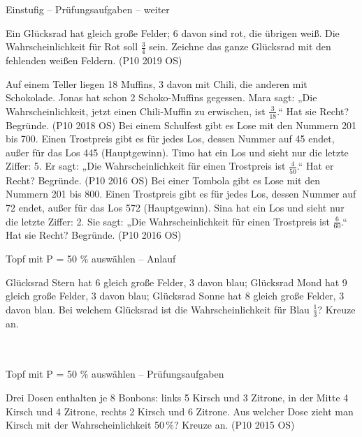 \begin{aufgabe}{Einstufig – Prüfungsaufgaben – weiter}
\begin{teile}
\teil Ein Glücksrad hat gleich große Felder; 6 davon sind rot, die übrigen weiß. Die Wahrscheinlichkeit für Rot soll $\frac{3}{4}$ sein. Zeichne das ganze Glücksrad mit den fehlenden weißen Feldern. \hfill (P10 2019 OS)

\kreisleer[2]
\teil Auf einem Teller liegen 18 Muffins, 3 davon mit Chili, die anderen mit Schokolade. Jonas hat schon 2 Schoko-Muffins gegessen. Mara sagt: „Die Wahrscheinlichkeit, jetzt einen Chili-Muffin zu erwischen, ist $\frac{3}{18}$.“ Hat sie Recht? Begründe. \hfill (P10 2018 OS)
\steil Bei einem Schulfest gibt es Lose mit den Nummern 201 bis 700. Einen Trostpreis gibt es für jedes Los, dessen Nummer auf 45 endet, außer für das Los 445 (Hauptgewinn). Timo hat ein Los und sieht nur die letzte Ziffer: 5. Er sagt: „Die Wahrscheinlichkeit für einen Trostpreis ist $\frac{4}{50}$.“ Hat er Recht? Begründe. \hfill (P10 2016 OS)
\steil Bei einer Tombola gibt es Lose mit den Nummern 201 bis 800. Einen Trostpreis gibt es für jedes Los, dessen Nummer auf 72 endet, außer für das Los 572 (Hauptgewinn). Sina hat ein Los und sieht nur die letzte Ziffer: 2. Sie sagt: „Die Wahrscheinlichkeit für einen Trostpreis ist $\frac{6}{60}$.“ Hat sie Recht? Begründe. \hfill (P10 2016 OS)
\end{teile}
\end{aufgabe}

\begin{aufgabe}{Topf mit P = 50 \% auswählen – Anlauf}
\begin{teile}
\teil Glücksrad Stern hat 6 gleich große Felder, 3 davon blau; Glücksrad Mond hat 9 gleich große Felder, 3 davon blau; Glücksrad Sonne hat 8 gleich große Felder, 3 davon blau. Bei welchem Glücksrad ist die Wahrscheinlichkeit für Blau $\frac{1}{3}$? Kreuze an. \\  \\  \\ 
\end{teile}
\end{aufgabe}

\begin{aufgabe}{Topf mit P = 50 \% auswählen – Prüfungsaufgaben}
\begin{teile}
\teil Drei Dosen enthalten je 8 Bonbons: links 5 Kirsch und 3 Zitrone, in der Mitte 4 Kirsch und 4 Zitrone, rechts 2 Kirsch und 6 Zitrone. Aus welcher Dose zieht man Kirsch mit der Wahrscheinlichkeit 50\,\%? Kreuze an. \hfill (P10 2015 OS) \\  \\  \\ 
\end{teile}
\end{aufgabe}


